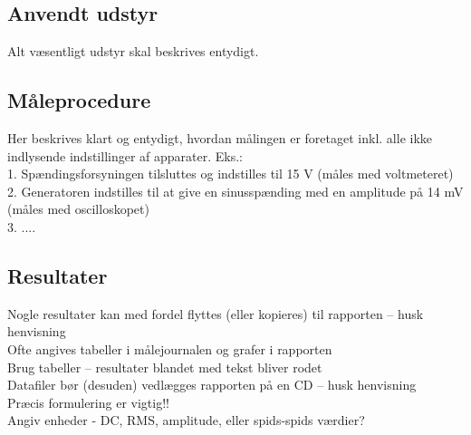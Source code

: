 \subsection*{Anvendt udstyr}
\label{maaleforforstaerker_anvendtudstyr}
Alt væsentligt udstyr skal beskrives entydigt.\\

\subsection*{Måleprocedure}
\label{maaleforforstaerker_maaleprocedure}
Her beskrives klart og entydigt, hvordan målingen er foretaget inkl. alle ikke indlysende indstillinger af apparater. Eks.: \\
1. Spændingsforsyningen tilsluttes og indstilles til 15 V (måles med voltmeteret) \\
2. Generatoren indstilles til at give en sinusspænding med en amplitude på 14 mV (måles med oscilloskopet) \\
3. ....\\

\subsection*{Resultater}
\label{maaleforforstaerker_resultater}
Nogle resultater kan med fordel flyttes (eller kopieres) til rapporten – husk henvisning \\
Ofte angives tabeller i målejournalen og grafer i rapporten \\
Brug tabeller – resultater blandet med tekst bliver rodet\\
Datafiler bør (desuden) vedlægges rapporten på en CD – husk henvisning\\
Præcis formulering er vigtig!!\\
Angiv enheder - DC, RMS, amplitude, eller spids-spids værdier?\\

